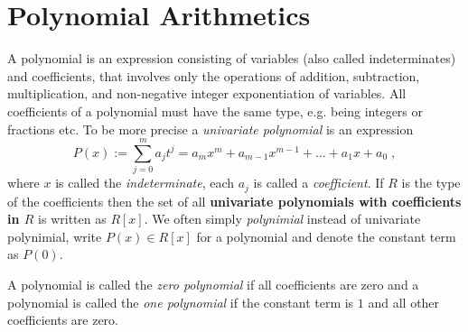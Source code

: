 \section{Polynomial Arithmetics}
A polynomial is an expression consisting of variables (also called indeterminates) and coefficients, that involves only the operations of addition, subtraction, multiplication, and non-negative integer exponentiation of variables. All coefficients of a polynomial must have the same type, e.g. being integers or fractions etc. To be more precise a \textit{univariate polynomial} is an expression
\begin{equation}
P(x) := \sum _{j = 0} ^{m}{a} _{j}{t} ^{j} ={a} _{m}x^m +{a} _{m-1} x^{m-1} + \dots + a_1 x + a_0 \;,
\end{equation}
where $x$ is called the \textit{indeterminate}, each $ a_j$ is called a \textit{coefficient}. If $R$ is the type of the coefficients then the set of all \textbf{univariate polynomials with coefficients in $R$} is written as $R[x]$. We often simply \textit{polynimial} instead of univariate polynimial, write $ P (x) \in R[x]$ for a polynomial and denote the constant term as $ P(0)$. 

A polynomial is called the \textit{zero polynomial} if all coefficients are zero and a polynomial is called the \textit{one polynomial} if the constant term is $1$ and all other coefficients are zero.

